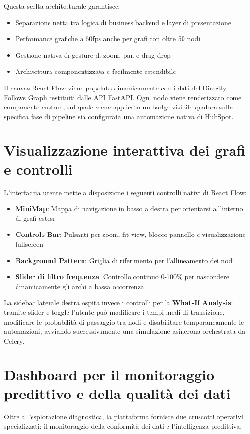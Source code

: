 \documentclass[12pt, a4paper]{report}
\begin{document}
Questa scelta architetturale garantisce:
\begin{itemize}
    \item Separazione netta tra logica di business backend e layer di presentazione
    \item Performance grafiche a 60fps anche per grafi con oltre 50 nodi
    \item Gestione nativa di gesture di zoom, pan e drag drop
    \item Architettura componentizzata e facilmente estendibile
\end{itemize}

Il canvas React Flow viene popolato dinamicamente con i dati del Directly-Follows Graph restituiti dalle API FastAPI. Ogni nodo viene renderizzato come componente custom, sul quale viene applicato un badge visibile qualora sulla specifica fase di pipeline sia configurata una automazione nativa di HubSpot.

\section{Visualizzazione interattiva dei grafi e controlli}

L'interfaccia utente mette a disposizione i seguenti controlli nativi di React Flow:
\begin{itemize}
    \item \textbf{MiniMap}: Mappa di navigazione in basso a destra per orientarsi all'interno di grafi estesi
    \item \textbf{Controls Bar}: Pulsanti per zoom, fit view, blocco pannello e visualizzazione fullscreen
    \item \textbf{Background Pattern}: Griglia di riferimento per l'allineamento dei nodi
    \item \textbf{Slider di filtro frequenza}: Controllo continuo 0-100\% per nascondere dinamicamente gli archi a bassa occorrenza
\end{itemize}

La sidebar laterale destra ospita invece i controlli per la \textbf{What-If Analysis}: tramite slider e toggle l'utente può modificare i tempi medi di transizione, modificare le probabilità di passaggio tra nodi e disabilitare temporaneamente le automazioni, avviando successivamente una simulazione asincrona orchestrata da Celery.

\section{Dashboard per il monitoraggio predittivo e della qualità dei dati}
Oltre all'esplorazione diagnostica, la piattaforma fornisce due cruscotti operativi specializzati: il monitoraggio della conformità dei dati e l'intelligenza predittiva.
\end{document}
